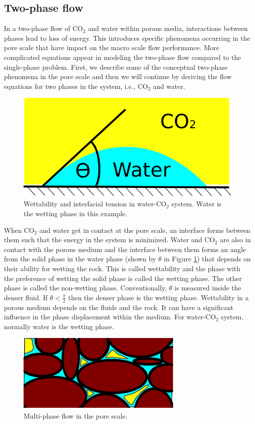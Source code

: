 \subsection{Two-phase flow}

In a two-phase flow of $\mbox{CO}_2$ and water within porous media, interactions
between phases lead to loss of energy. This introduces specific phenomena
occurring in the pore scale that have impact on the macro scale flow
performance.
More complicated equations appear in modeling the two-phase flow compared to the
single-phase problem. First, we describe some of the conceptual two-phase
phenomena in the pore scale and then we will continue by deriving the flow
equations for two phases in the system, i.e., $\mbox{CO}_2$ and water.

\begin{figure}
 \centering{}
 \includegraphics[width=0.35\linewidth]{./figurer/wettability}
 \caption{Wettability and interfacial tension in water-$\mbox{CO}_2$ system. Water is the wetting phase in this example.}
 \label{fig:wetting}
\end{figure}

When $\mbox{CO}_2$ and water get in contact at the pore scale, an interface
forms between them such that the energy in the system is minimized. Water and
$\mbox{CO}_2$ are also in contact with the porous medium and the interface
between them forms an angle from the solid phase in the water phase (shown by
$\theta$ in Figure \ref{fig:wetting}) that depends on their ability for
wetting the rock. This is called wettability and the phase with the
preference of wetting the solid phase is called the wetting phase. The other
phase is called the non-wetting phase.  Conventionally, $\theta$ is measured
inside the denser fluid. If $\theta < \frac{\pi}{2}$ then the denser phase is
the wetting phase. Wettability in a porous medium depends on the fluids and the
rock. It can have a significant influence in the phase displacement within the
medium. For water-$\mbox{CO}_2$ system, normally water is the wetting phase. 

\begin{figure}
 \centering{}
 \includegraphics[width=0.35\linewidth]{./figurer/K2}
  \caption{Multi-phase flow in the pore scale.}
 \label{fig:mphf}
\end{figure}

